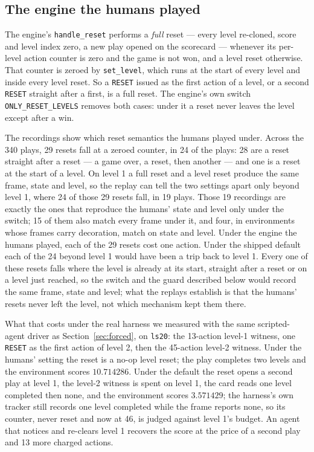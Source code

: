 \documentclass[11pt]{article}
\newcommand{\code}[1]{\texttt{#1}}
\begin{document}
\subsection{The engine the humans played}
\label{sec:humanengine}

The engine's \code{handle\_reset} performs a \emph{full} reset --- every level
re-cloned, score and level index zero, a new play opened on the scorecard ---
whenever its per-level action counter is zero and the game is not won, and a
level reset otherwise. That counter is zeroed by \code{set\_level}, which runs
at the start of every level and inside every level reset. So a \code{RESET}
issued as the first action of a level, or a second \code{RESET} straight after
a first, is a full reset. The engine's own switch \code{ONLY\_RESET\_LEVELS}
removes both cases: under it a reset never leaves the level except after a win.

The recordings show which reset semantics the humans played under. Across
the 340 plays, 29 resets fall at a zeroed counter, in 24 of the plays: 28 are
a reset straight after a reset --- a game over, a reset, then another --- and
one is a reset at the start of a level. On level 1 a full reset and a level
reset produce the same frame, state and level, so the replay can tell the two
settings apart only beyond level 1, where 24 of those 29 resets fall, in 19
plays. Those 19 recordings are exactly the ones that reproduce the humans'
state and level only under the switch; 15 of them also match every frame under
it, and four, in environments whose frames carry decoration, match on state
and level. Under the engine the humans played, each of the 29 resets cost one
action. Under the shipped default each of the 24 beyond level 1 would have been
a trip back to level 1. Every one of these resets falls where the level is
already at its start, straight after a reset or on a level just reached, so the
switch and the guard described below would record the same frame, state and
level; what the replays establish is that the humans' resets never left the
level, not which mechanism kept them there.

What that costs under the real harness we measured with the same
scripted-agent driver as Section~\ref{sec:forced}, on \code{ls20}: the 13-action
level-1 witness, one \code{RESET} as the first action of level 2, then the
45-action level-2 witness. Under the humans' setting the reset is a no-op
level reset; the play completes two levels and the environment scores
$10.714286$. Under the default the reset opens a second play at level 1, the
level-2 witness is spent on level 1, the card reads one level completed then
none, and the environment scores $3.571429$; the harness's own tracker still
records one level completed while the frame reports none, so its counter,
never reset and now at 46, is judged against level 1's budget. An agent that notices and re-clears level 1 recovers
the score at the price of a second play and 13 more charged actions.
\end{document}
